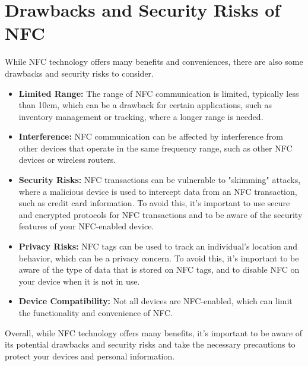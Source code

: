 \documentclass[12pt,a4paper]{article}
\begin{document}
\section*{Drawbacks and Security Risks of NFC}
While NFC technology offers many benefits and conveniences, there are also some drawbacks and security risks to consider.
\begin{itemize}
    \item \textbf{Limited Range:} The range of NFC communication is limited, typically less than 10cm, which can be a drawback for certain applications, such as inventory management or tracking, where a longer range is needed.
    \item \textbf{Interference:} NFC communication can be affected by interference from other devices that operate in the same frequency range, such as other NFC devices or wireless routers.
    \item \textbf{Security Risks:} NFC transactions can be vulnerable to "skimming" attacks, where a malicious device is used to intercept data from an NFC transaction, such as credit card information. To avoid this, it's important to use secure and encrypted protocols for NFC transactions and to be aware of the security features of your NFC-enabled device.
    \item \textbf{Privacy Risks:} NFC tags can be used to track an individual's location and behavior, which can be a privacy concern. To avoid this, it's important to be aware of the type of data that is stored on NFC tags, and to disable NFC on your device when it is not in use.
    \item \textbf{Device Compatibility:} Not all devices are NFC-enabled, which can limit the functionality and convenience of NFC.
\end{itemize}

Overall, while NFC technology offers many benefits, it's important to be aware of its potential drawbacks and security risks and take the necessary precautions to protect your devices and personal information.
\end{document}
